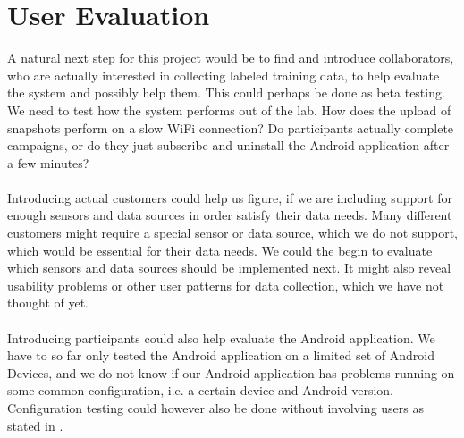 \section{User Evaluation}

A natural next step for this project would be to find and introduce collaborators, who are actually interested in collecting labeled training data, to help evaluate the system and possibly help them. This could perhaps be done as beta testing. We need to test how the system performs out of the lab. How does the upload of snapshots perform on a slow WiFi connection? Do participants actually complete campaigns, or do they just subscribe and uninstall the Android application after a few minutes? 
\\\\
Introducing actual customers could help us figure, if we are including support for enough sensors and data sources in order satisfy their data needs. Many different customers might require a special sensor or data source, which we do not support, which would be essential for their data needs. We could the begin to evaluate which sensors and data sources should be implemented next. It might also reveal usability problems or other user patterns for data collection, which we have not thought of yet. 
\\\\
Introducing participants could also help evaluate the Android application. We have to so far only tested the Android application on a limited set of Android Devices, and we do not know if our Android application has problems running on some common configuration, i.e. a certain device and Android version. Configuration testing could however also be done without involving users as stated in .  